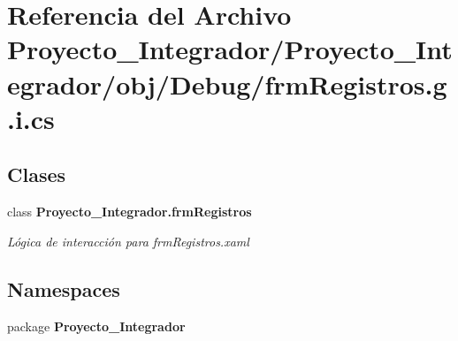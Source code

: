\section{Referencia del Archivo Proyecto\-\_\-\-Integrador/\-Proyecto\-\_\-\-Integrador/obj/\-Debug/frm\-Registros.g.\-i.\-cs}
\label{frm_registros_8g_8i_8cs}
\subsection*{Clases}
\begin{DoxyCompactItemize}
\item 
class {\bf Proyecto\-\_\-\-Integrador.\-frm\-Registros}
\begin{DoxyCompactList}\small\item\em Lógica de interacción para frm\-Registros.\-xaml \end{DoxyCompactList}\end{DoxyCompactItemize}
\subsection*{Namespaces}
\begin{DoxyCompactItemize}
\item 
package {\bf Proyecto\-\_\-\-Integrador}
\end{DoxyCompactItemize}
